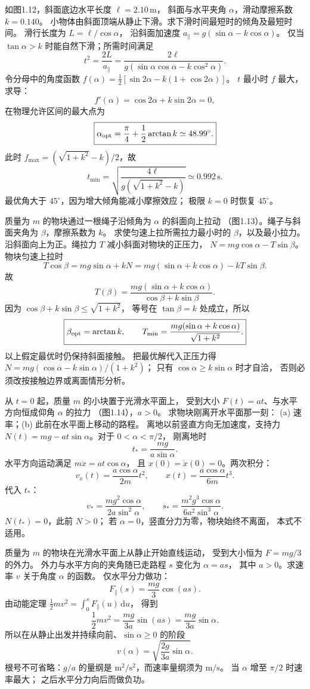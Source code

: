 如图1.12，斜面底边水平长度 $\ell=2.10\,\mathrm m$，
斜面与水平夹角 $\alpha$，滑动摩擦系数 $k=0.140$。
小物体由斜面顶端从静止下滑。求下滑时间最短时的倾角及最短时间。
\exsolution
滑行长度为 $L=\ell/\cos\alpha$，
沿斜面加速度
$a_\parallel=g(\sin\alpha-k\cos\alpha)$。
仅当 $\tan\alpha>k$ 时能自然下滑；所需时间满足
\[
 t^2=\frac{2L}{a_\parallel}
 =\frac{2\ell}{g(\sin\alpha\cos\alpha-k\cos^2\alpha)}.
\]
令分母中的角度函数
$f(\alpha)=\frac12[\sin2\alpha-k(1+\cos2\alpha)]$。
$t$ 最小时 $f$ 最大，求导：
\[
 f'(\alpha)=\cos2\alpha+k\sin2\alpha=0,
\]
在物理允许区间的最大点为
\[
 \boxed{\alpha_{\rm opt}
 =\frac\pi4+\frac12\arctan k
 \simeq48.99^\circ.}
\]
此时 $f_{\max}=(\sqrt{1+k^2}-k)/2$，故
\[
 \boxed{t_{\min}=
 \sqrt{\frac{4\ell}{g(\sqrt{1+k^2}-k)}}
 \simeq0.992\,\mathrm s.}
\]
\excheck 最优角大于 $45^\circ$，因为增大倾角能减小摩擦效应；
极限 $k=0$ 时恢复 $45^\circ$。

质量为 $m$ 的物块通过一根绳子沿倾角为 $\alpha$ 的斜面向上拉动
（图1.13）。绳子与斜面夹角为 $\beta$，摩擦系数为 $k$。
求使匀速上拉所需拉力最小时的 $\beta$，以及最小拉力。
\exsolution
沿斜面向上为正。绳拉力 $T$ 减小斜面对物块的正压力，
$N=mg\cos\alpha-T\sin\beta$。
物块匀速上拉时
\[
 T\cos\beta=mg\sin\alpha+kN
 =mg(\sin\alpha+k\cos\alpha)-kT\sin\beta.
\]
故
\[
 T(\beta)=\frac{mg(\sin\alpha+k\cos\alpha)}
 {\cos\beta+k\sin\beta}.
\]
因为
$\cos\beta+k\sin\beta\le\sqrt{1+k^2}$，
等号在 $\tan\beta=k$ 处成立，所以
\[
 \boxed{\beta_{\rm opt}=\arctan k,\qquad
 T_{\min}=\frac{mg(\sin\alpha+k\cos\alpha)}
 {\sqrt{1+k^2}}.}
\]
\excheck 以上假定最优时仍保持斜面接触。
把最优解代入正压力得
$N=mg(\cos\alpha-k\sin\alpha)/(1+k^2)$；
只有 $\cos\alpha\ge k\sin\alpha$ 时才自洽，
否则必须改按接触边界或离面情形分析。

从 $t=0$ 起，质量 $m$ 的小块置于光滑水平面上，
受到大小 $F(t)=at$、与水平方向恒成仰角 $\alpha$ 的拉力
（图1.14），$a>0$。
求物块刚离开水平面那一刻：
(a) 速率；(b) 此前在水平面上移动的路程。
\exsolution
离地以前竖直方向无加速度，支持力
$N(t)=mg-at\sin\alpha$。对于 $0<\alpha<\pi/2$，
刚离地时
\[
 t_*=\frac{mg}{a\sin\alpha}.
\]
水平方向运动满足
$m\ddot x=at\cos\alpha$，
且 $x(0)=\dot x(0)=0$。两次积分：
\[
 v_x(t)=\frac{a\cos\alpha}{2m}t^2,\qquad
 x(t)=\frac{a\cos\alpha}{6m}t^3.
\]
代入 $t_*$：
\[
 \boxed{v_*=\frac{mg^2\cos\alpha}{2a\sin^2\alpha},\qquad
 s_*=\frac{m^2g^3\cos\alpha}{6a^2\sin^3\alpha}.}
\]
\excheck $N(t_*)=0$，此前 $N>0$；
若 $\alpha=0$，竖直分力为零，物块始终不离面，
本式不适用。

质量为 $m$ 的物块在光滑水平面上从静止开始直线运动，
受到大小恒为 $F=mg/3$ 的外力。
外力与水平方向的夹角随已走路程 $s$ 变化为 $\alpha=as$，
其中 $a>0$。求速率 $v$ 关于角度 $\alpha$ 的函数。
\exsolution
仅水平分力做功：
\[
 F_\parallel(s)=\frac{mg}{3}\cos(as).
\]
由动能定理
$\frac12mv^2=\int_0^s F_\parallel(u)\,\mathrm du$，
得到
\[
 \frac12mv^2=\frac{mg}{3a}\sin(as)
 =\frac{mg}{3a}\sin\alpha.
\]
所以在从静止出发并持续向前、$\sin\alpha\ge0$ 的阶段
\[
 \boxed{v(\alpha)=\sqrt{\frac{2g}{3a}\sin\alpha}.}
\]
\excheck 根号不可省略：$g/a$ 的量纲是
$\mathrm{m^2/s^2}$，而速率量纲须为 $\mathrm{m/s}$。
当 $\alpha$ 增至 $\pi/2$ 时速率最大；
之后水平分力向后而做负功。

